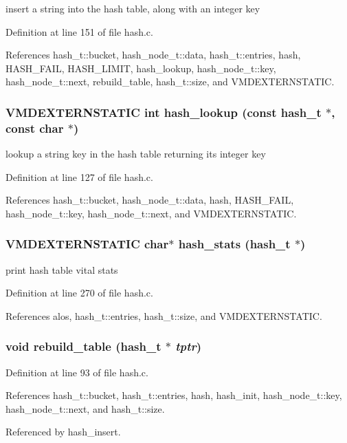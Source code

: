 insert a string into the hash table, along with an integer key 

Definition at line 151 of file hash.c.

References hash\_\-t::bucket, hash\_\-node\_\-t::data, hash\_\-t::entries, hash, HASH\_\-FAIL, HASH\_\-LIMIT, hash\_\-lookup, hash\_\-node\_\-t::key, hash\_\-node\_\-t::next, rebuild\_\-table, hash\_\-t::size, and VMDEXTERNSTATIC.
\subsubsection{\setlength{\rightskip}{0pt plus 5cm}VMDEXTERNSTATIC int hash\_\-lookup (const {\bf hash\_\-t} $\ast$, const char $\ast$)}\label{hash_8c_a5}


lookup a string key in the hash table returning its integer key 

Definition at line 127 of file hash.c.

References hash\_\-t::bucket, hash\_\-node\_\-t::data, hash, HASH\_\-FAIL, hash\_\-node\_\-t::key, hash\_\-node\_\-t::next, and VMDEXTERNSTATIC.
\subsubsection{\setlength{\rightskip}{0pt plus 5cm}VMDEXTERNSTATIC char$\ast$ hash\_\-stats ({\bf hash\_\-t} $\ast$)}\label{hash_8c_a10}


print hash table vital stats 

Definition at line 270 of file hash.c.

References alos, hash\_\-t::entries, hash\_\-t::size, and VMDEXTERNSTATIC.
\subsubsection{\setlength{\rightskip}{0pt plus 5cm}void rebuild\_\-table ({\bf hash\_\-t} $\ast$ {\em tptr})\hspace{0.3cm}{\tt  [static]}}\label{hash_8c_a4}




Definition at line 93 of file hash.c.

References hash\_\-t::bucket, hash\_\-t::entries, hash, hash\_\-init, hash\_\-node\_\-t::key, hash\_\-node\_\-t::next, and hash\_\-t::size.

Referenced by hash\_\-insert.